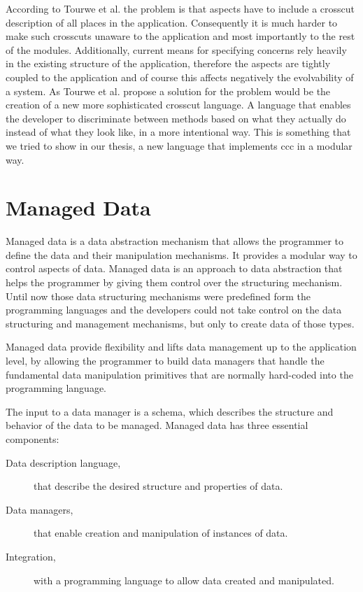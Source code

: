 According to Tourwe et al. \cite{tourwe2003existence} the problem is that aspects have to include a crosscut description of all places in the application. 
Consequently it is much harder to make such crosscuts unaware to the application and most importantly to the rest of the modules. 
Additionally, current means for specifying concerns rely heavily in the existing structure of the application, therefore the aspects are tightly coupled to the application and of course this affects negatively the evolvability of a system.
As Tourwe et al. \cite{tourwe2003existence} propose a solution for the problem would be the creation of a new more sophisticated crosscut language. 
A language that enables the developer to discriminate between methods based on what they actually do instead of what they look like, in a more intentional way.
This is something that we tried to show in our thesis, a new language that implements \ac{ccc} in a modular way.

\section{Managed Data}\label{Managed Data}
Managed data \cite{loh2012managed} is a data abstraction mechanism that allows the programmer to define the data and their manipulation mechanisms. 
It provides a modular way to control aspects of data.
Managed data is an approach to data abstraction that helps the programmer by giving them control over the structuring mechanism. 
Until now those data structuring mechanisms were predefined form the programming languages and the developers could not take control on the data structuring and management mechanisms, but only to create data of those types.

Managed data provide flexibility and lifts data management up to the application level, by allowing the programmer to build data managers that handle the fundamental data manipulation primitives that are normally hard-coded into the programming language. 

The input to a data manager is a schema, which describes the structure and behavior of the data to be managed. Managed data has three essential components:

\begin{description}
	\item [Data description language,] that describe the desired structure and properties of data.
	\item [Data managers,] that enable creation and manipulation of instances of data.
	\item [Integration,] with a programming language to allow data created and manipulated.
\end{description}

